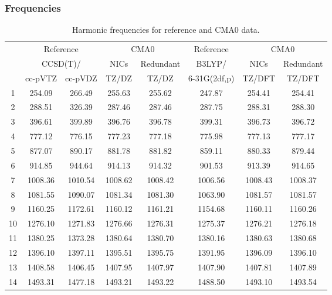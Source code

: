 \documentclass[10pt,oneside]{article}
\begin{document}
\begin{table}[h!]
\subsubsection*{Frequencies}
\centering
\caption{Harmonic frequencies for reference and CMA0 data.}
\begin{tabular}{cccccccc}
\toprule
{} & \multicolumn{2}{c}{Reference} & \multicolumn{2}{c}{CMA0} &    Reference & \multicolumn{2}{c}{CMA0} \\
{} & \multicolumn{2}{c}{CCSD(T)/} &    NICs &  Redundant &       B3LYP/ &    NICs & Redundant \\
{} &   cc-pVTZ & cc-pVDZ &   TZ/DZ &      TZ/DZ & 6-31G(2df,p) &  TZ/DFT &    TZ/DFT \\
\midrule
1  &    254.09 &  266.49 &  255.63 &     255.62 &       247.87 &  254.41 &    254.41 \\
2  &    288.51 &  326.39 &  287.46 &     287.46 &       287.75 &  288.31 &    288.30 \\
3  &    396.61 &  399.89 &  396.76 &     396.78 &       399.31 &  396.73 &    396.72 \\
4  &    777.12 &  776.15 &  777.23 &     777.18 &       775.98 &  777.13 &    777.17 \\
5  &    877.07 &  890.17 &  881.78 &     881.82 &       859.11 &  880.33 &    879.44 \\
6  &    914.85 &  944.64 &  914.13 &     914.32 &       901.53 &  913.39 &    914.65 \\
7  &   1008.36 & 1010.54 & 1008.62 &    1008.42 &      1006.56 & 1008.43 &   1008.37 \\
8  &   1081.55 & 1090.07 & 1081.34 &    1081.30 &      1063.90 & 1081.57 &   1081.57 \\
9  &   1160.25 & 1172.61 & 1160.12 &    1161.21 &      1154.68 & 1160.11 &   1160.26 \\
10 &   1276.10 & 1271.83 & 1276.66 &    1276.31 &      1275.37 & 1276.21 &   1276.18 \\
11 &   1380.25 & 1373.28 & 1380.64 &    1380.70 &      1380.16 & 1380.63 &   1380.68 \\
12 &   1396.10 & 1397.11 & 1395.51 &    1395.75 &      1391.95 & 1396.09 &   1396.10 \\
13 &   1408.58 & 1406.45 & 1407.95 &    1407.97 &      1407.90 & 1407.81 &   1407.89 \\
14 &   1493.31 & 1477.18 & 1493.21 &    1493.22 &      1488.50 & 1493.10 &   1493.54 \\

\end{tabular}
\end{table}
\end{document}
